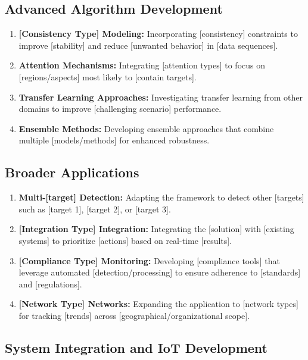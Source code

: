 \subsection{Advanced Algorithm Development}

\begin{enumerate}
\item \textbf{[Consistency Type] Modeling:} Incorporating [consistency] constraints to improve [stability] and reduce [unwanted behavior] in [data sequences].

\item \textbf{Attention Mechanisms:} Integrating [attention types] to focus on [regions/aspects] most likely to [contain targets].

\item \textbf{Transfer Learning Approaches:} Investigating transfer learning from other domains to improve [challenging scenario] performance.

\item \textbf{Ensemble Methods:} Developing ensemble approaches that combine multiple [models/methods] for enhanced robustness.
\end{enumerate}

\subsection{Broader Applications}

\begin{enumerate}
\item \textbf{Multi-[target] Detection:} Adapting the framework to detect other [targets] such as [target 1], [target 2], or [target 3].

\item \textbf{[Integration Type] Integration:} Integrating the [solution] with [existing systems] to prioritize [actions] based on real-time [results].

\item \textbf{[Compliance Type] Monitoring:} Developing [compliance tools] that leverage automated [detection/processing] to ensure adherence to [standards] and [regulations].

\item \textbf{[Network Type] Networks:} Expanding the application to [network types] for tracking [trends] across [geographical/organizational scope].
\end{enumerate}

\subsection{System Integration and IoT Development}

